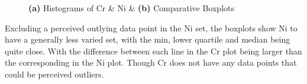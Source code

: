 \documentclass[11pt]{article}
\begin{document}
\begin{enumerate}
        \begin{figure}[h]
                \centering
                        \hfill
                        \hfill
                \caption{\textbf{(a)} Histograms of Cr \& Ni \& \textbf{(b)} Comparative Boxplots}
                \label{fig_graph} 
        \end{figure}


        Excluding a perceived outlying data point in the Ni set, the boxplots show Ni to have a generally less varied set, with the min, lower quartile and median being quite close. With the difference between each line in the Cr plot being larger than the corresponding in the Ni plot. Though Cr does not have any data points that could be perceived outliers.


\end{enumerate}
\end{document}
